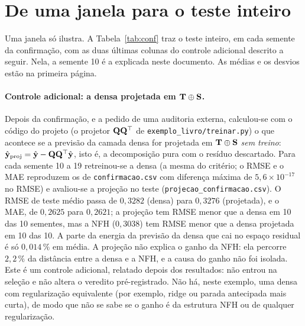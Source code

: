 \documentclass[11pt,a4paper]{article}
\begin{document}
\section{De uma janela para o teste inteiro}\label{sec:resumo}

Uma janela só ilustra. A Tabela~\ref{tab:conf} traz o teste inteiro, em cada semente da confirmação, com as duas últimas colunas do controle adicional descrito a seguir. Nela, a semente 10 é a explicada neste documento. As médias e os desvios estão na primeira página.

\paragraph{Controle adicional: a densa projetada em $\mathbf{T}\oplus\mathbf{S}$.} Depois da confirmação, e a pedido de uma auditoria externa, calculou-se com o código do projeto (o projetor $\mathbf{Q}\mathbf{Q}^\top$ de \texttt{exemplo\_livro/treinar.py}) o que acontece se a previsão da camada densa for projetada em $\mathbf{T}\oplus\mathbf{S}$ \emph{sem treino}: $\hat{\mathbf{y}}_{\mathrm{proj}}=\hat{\mathbf{y}}-\mathbf{Q}\mathbf{Q}^\top\hat{\mathbf{y}}$, isto é, a decomposição pura com o resíduo descartado. Para cada semente 10 a 19 retreinou-se a densa (a mesma do critério; o RMSE e o MAE reproduzem os de \texttt{confirmacao.csv} com diferença máxima de $5,6\times 10^{-17}$ no RMSE) e avaliou-se a projeção no teste (\texttt{projecao\_confirmacao.csv}). O RMSE de teste médio passa de $0,3282$ (densa) para $0,3276$ (projetada), e o MAE, de $0,2625$ para $0,2621$; a projeção tem RMSE menor que a densa em 10 das 10 sementes, mas a NFH ($0,3038$) tem RMSE menor que a densa projetada em 10 das 10. A parte da energia da previsão da densa que cai no espaço residual é só $0,014\,\%$ em média. A projeção não explica o ganho da NFH: ela percorre $2,2\,\%$ da distância entre a densa e a NFH, e a causa do ganho não foi isolada. Este é um controle adicional, relatado depois dos resultados: não entrou na seleção e não altera o veredito pré-registrado. Não há, neste exemplo, uma densa com regularização equivalente (por exemplo, ridge ou parada antecipada mais curta), de modo que não se sabe se o ganho é da estrutura NFH ou de qualquer regularização.
\end{document}
